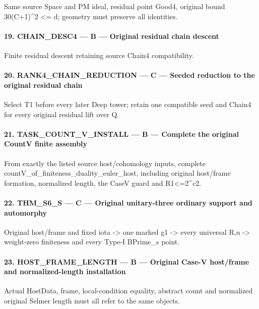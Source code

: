 Same source Space and PM ideal, residual point Good4, original bound 30(C+1)\textasciicircum{}2 <= d; geometry must preserve all identities.

\paragraph{19. CHAIN\_\allowbreak{}DESC4 — B — Original residual chain descent}

Finite residual descent retaining source Chain4 compatibility.

\paragraph{20. RANK4\_\allowbreak{}CHAIN\_\allowbreak{}REDUCTION — C — Seeded reduction to the original residual chain}

Select T1 before every later Deep tower; retain one compatible seed and Chain4 for every original residual lift over Q.

\paragraph{21. TASK\_\allowbreak{}COUNT\_\allowbreak{}V\_\allowbreak{}INSTALL — B — Complete the original CountV finite assembly}

From exactly the listed source host/\allowbreak{}cohomology inputs, complete countV\_\allowbreak{}of\_\allowbreak{}finiteness\_\allowbreak{}duality\_\allowbreak{}euler\_\allowbreak{}host, including original host/\allowbreak{}frame formation, normalized length, the CaseV guard and R1<=2\textasciicircum{}c2.

\paragraph{22. THM\_\allowbreak{}S6\_\allowbreak{}S — C — Original unitary-three ordinary support and automorphy}

Original host/\allowbreak{}frame and fixed iota -> one marked g1 -> every universal R,u -> weight-zero finiteness and every Type-I BPrime\_\allowbreak{}s point.

\paragraph{23. HOST\_\allowbreak{}FRAME\_\allowbreak{}LENGTH — B — Original Case-V host/\allowbreak{}frame and normalized-length installation}

Actual HostData, frame, local-condition equality, abstract count and normalized original Selmer length must all refer to the same objects.

